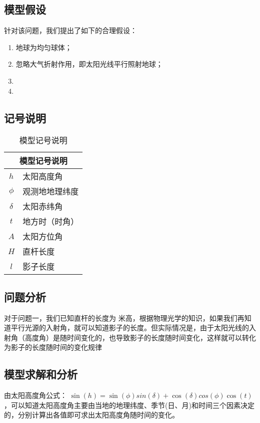 \documentclass[nocover]{cumcmart}%
\begin{document}
\subsection{模型假设}
针对该问题，我们提出了如下的合理假设：
\begin{enumerate}
\item 地球为均匀球体；
\item 忽略大气折射作用，即太阳光线平行照射地球；
\item 
\item 
\end{enumerate}

\subsection{记号说明}
\begin{table}[!htbp]
    \centering
    \begin{tabular}{cl}
    \toprule
    \multicolumn{2}{c}{\large 模型记号说明}\\
    \midrule
        $h$           & 太阳高度角 \\
        $\phi$        & 观测地地理纬度  \\
        $\delta$      & 太阳赤纬角  \\
        $t$           & 地方时（时角） \\  
        $A$           & 太阳方位角 \\
        $H$          & 直杆长度  \\
        $l$          & 影子长度  \\
    \bottomrule
    \end{tabular}
    \caption{模型记号说明}
\end{table}

\subsection{问题分析}
对于问题一，我们已知直杆的长度为 米高，根据物理光学的知识，如果我们再知道平行光源的入射角，就可以知道影子的长度。但实际情况是，由于太阳光线的入射角（高度角）是随时间变化的，也导致影子的长度随时间变化，这样就可以转化为影子的长度随时间的变化规律
\subsection{模型求解和分析}
由太阳高度角公式： $ \sin(h) = \sin(\phi)sin(\delta)+\cos(\delta)cos(\phi)\cos(t)$，可以知道太阳高度角主要由当地的地理纬度、季节(日、月)和时间三个因素决定的，分别计算出各值即可求出太阳高度角随时间的变化。
\end{document}
